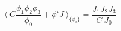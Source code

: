 \begin{equation}
\label{leg}
\langle\  C\frac{\phi_1 \phi_2 \phi_3}{\phi_0} 
+ \phi^t J \ \rangle_{\{\phi_i\}} = \frac{J_1 J_2 J_3}{C~J_0}
\end{equation}

